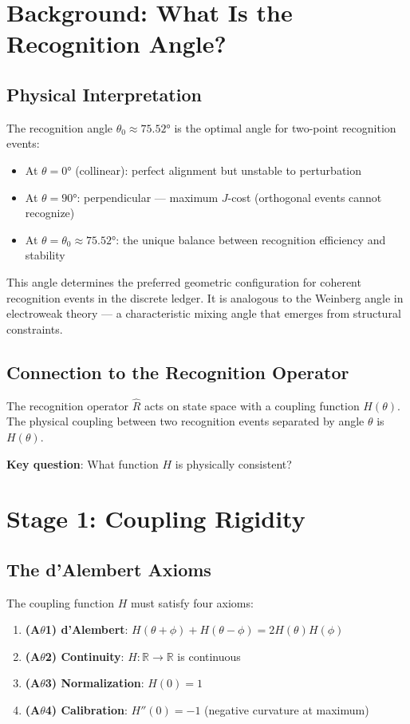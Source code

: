 \documentclass[12pt,a4paper]{article}
\theoremstyle{definition}
\theoremstyle{remark}
\begin{document}
\section{Background: What Is the Recognition Angle?}

\subsection{Physical Interpretation}

The recognition angle $\theta_0 \approx 75.52°$ is the optimal angle for two-point recognition events:
\begin{itemize}
\item At $\theta = 0°$ (collinear): perfect alignment but unstable to perturbation
\item At $\theta = 90°$: perpendicular — maximum $J$-cost (orthogonal events cannot recognize)
\item At $\theta = \theta_0 \approx 75.52°$: the unique balance between recognition efficiency and stability
\end{itemize}

This angle determines the preferred geometric configuration for coherent recognition 
events in the discrete ledger. It is analogous to the Weinberg angle in electroweak 
theory — a characteristic mixing angle that emerges from structural constraints.

\subsection{Connection to the Recognition Operator}

The recognition operator $\hat{R}$ acts on state space with a coupling function $H(\theta)$.
The physical coupling between two recognition events separated by angle $\theta$ is $H(\theta)$.

\textbf{Key question}: What function $H$ is physically consistent?

\section{Stage 1: Coupling Rigidity}

\subsection{The d'Alembert Axioms}

The coupling function $H$ must satisfy four axioms:
\begin{enumerate}
\item \textbf{(A$\theta$1) d'Alembert}: $H(\theta + \phi) + H(\theta - \phi) = 2H(\theta)H(\phi)$
\item \textbf{(A$\theta$2) Continuity}: $H: \mathbb{R} \to \mathbb{R}$ is continuous
\item \textbf{(A$\theta$3) Normalization}: $H(0) = 1$
\item \textbf{(A$\theta$4) Calibration}: $H''(0) = -1$ (negative curvature at maximum)
\end{enumerate}
\end{document}
